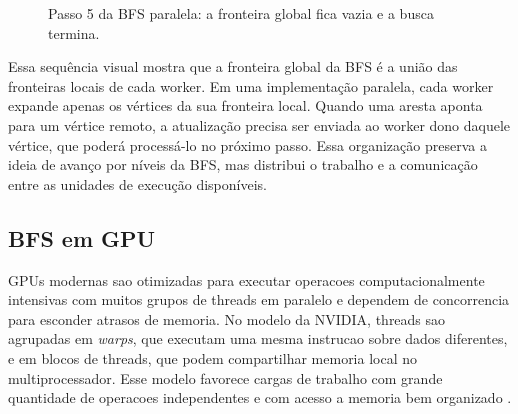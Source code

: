 \documentclass{article}
\begin{document}
\begin{figure}[H]
\centering
{}
\caption{Passo 5 da BFS paralela: a fronteira global fica vazia e a busca termina.}
\label{fig:bfs-paralela-step5}
\end{figure}

Essa sequência visual mostra que a fronteira global da BFS é a união das
fronteiras locais de cada worker. Em uma implementação paralela, cada worker
expande apenas os vértices da sua fronteira local. Quando uma aresta aponta para
um vértice remoto, a atualização precisa ser enviada ao worker dono daquele
vértice, que poderá processá-lo no próximo passo. Essa organização preserva a
ideia de avanço por níveis da BFS, mas distribui o trabalho e a comunicação entre
as unidades de execução disponíveis.

\subsection{BFS em GPU}
GPUs modernas sao otimizadas para executar operacoes computacionalmente intensivas 
com muitos grupos de threads em paralelo e dependem de concorrencia para esconder 
atrasos de memoria. No modelo da NVIDIA, threads sao agrupadas em \textit{warps}, 
que executam uma mesma instrucao sobre dados diferentes, e em blocos de threads, 
que podem compartilhar memoria local no multiprocessador. Esse modelo favorece 
cargas de trabalho com grande quantidade de operacoes independentes e com acesso 
a memoria bem organizado \cite{merrillgpu}.
\end{document}

